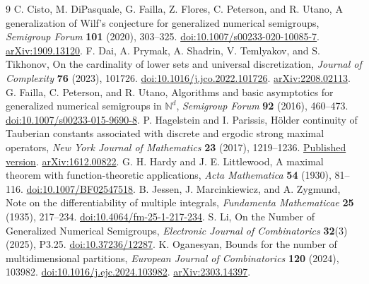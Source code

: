 \documentclass[11pt]{article}
\theoremstyle{remark}
\begin{document}
\clearpage
\begin{thebibliography}{9}
C. Cisto, M. DiPasquale, G. Failla, Z. Flores, C. Peterson, and R. Utano,
A generalization of Wilf's conjecture for generalized numerical semigroups,
\emph{Semigroup Forum} \textbf{101} (2020), 303--325.
\href{https://doi.org/10.1007/s00233-020-10085-7}{doi:10.1007/s00233-020-10085-7}.
\href{https://arxiv.org/abs/1909.13120}{arXiv:1909.13120}.
F. Dai, A. Prymak, A. Shadrin, V. Temlyakov, and S. Tikhonov,
On the cardinality of lower sets and universal discretization,
\emph{Journal of Complexity} \textbf{76} (2023), 101726.
\href{https://doi.org/10.1016/j.jco.2022.101726}{doi:10.1016/j.jco.2022.101726}.
\href{https://arxiv.org/abs/2208.02113}{arXiv:2208.02113}.
G. Failla, C. Peterson, and R. Utano,
Algorithms and basic asymptotics for generalized numerical semigroups in $\mathbb N^d$,
\emph{Semigroup Forum} \textbf{92} (2016), 460--473.
\href{https://doi.org/10.1007/s00233-015-9690-8}{doi:10.1007/s00233-015-9690-8}.
P. Hagelstein and I. Parissis,
H\"older continuity of Tauberian constants associated with discrete and ergodic strong maximal operators,
\emph{New York Journal of Mathematics} \textbf{23} (2017), 1219--1236.
\href{https://nyjm.albany.edu/j/2017/23-53p.pdf}{Published version}.
\href{https://arxiv.org/abs/1612.00822}{arXiv:1612.00822}.
G. H. Hardy and J. E. Littlewood,
A maximal theorem with function-theoretic applications,
\emph{Acta Mathematica} \textbf{54} (1930), 81--116.
\href{https://doi.org/10.1007/BF02547518}{doi:10.1007/BF02547518}.
B. Jessen, J. Marcinkiewicz, and A. Zygmund,
Note on the differentiability of multiple integrals,
\emph{Fundamenta Mathematicae} \textbf{25} (1935), 217--234.
\href{https://doi.org/10.4064/fm-25-1-217-234}{doi:10.4064/fm-25-1-217-234}.
S. Li, On the Number of Generalized Numerical Semigroups,
\emph{Electronic Journal of Combinatorics} \textbf{32}(3) (2025), P3.25.
\href{https://doi.org/10.37236/12287}{doi:10.37236/12287}.
K. Oganesyan, Bounds for the number of multidimensional partitions,
\emph{European Journal of Combinatorics} \textbf{120} (2024), 103982.
\href{https://doi.org/10.1016/j.ejc.2024.103982}{doi:10.1016/j.ejc.2024.103982}.
\href{https://arxiv.org/abs/2303.14397}{arXiv:2303.14397}.
\end{thebibliography}
\end{document}
